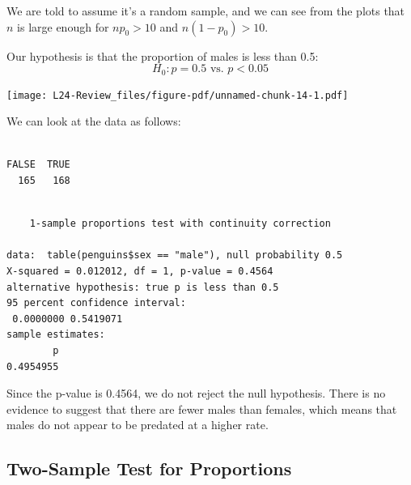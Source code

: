 \documentclass[
  letterpaper,
  DIV=11,
  numbers=noendperiod,
  oneside]{scrreprt}
\newenvironment{Shaded}{\begin{snugshade}}{\end{snugshade}}
\newcommand{\AttributeTok}[1]{\textcolor[rgb]{0.40,0.45,0.13}{#1}}
\newcommand{\FloatTok}[1]{\textcolor[rgb]{0.68,0.00,0.00}{#1}}
\newcommand{\FunctionTok}[1]{\textcolor[rgb]{0.28,0.35,0.67}{#1}}
\newcommand{\NormalTok}[1]{\textcolor[rgb]{0.00,0.23,0.31}{#1}}
\newcommand{\SpecialCharTok}[1]{\textcolor[rgb]{0.37,0.37,0.37}{#1}}
\newcommand{\StringTok}[1]{\textcolor[rgb]{0.13,0.47,0.30}{#1}}
\begin{document}
\vspace{1cm}

We are told to assume it's a random sample, and we can see from the
plots that \(n\) is large enough for \(np_0>10\) and \(n(1-p_0)>10\).

Our hypothesis is that the proportion of males is less than 0.5: \[
H_0: p = 0.5\text{ vs. }p < 0.05
\]

\texttt{[image: L24-Review\_files/figure-pdf/unnamed-chunk-14-1.pdf]}

We can look at the data as follows:

\begin{Shaded}
\end{Shaded}

\begin{verbatim}

FALSE  TRUE 
  165   168 
\end{verbatim}

\begin{Shaded}
\end{Shaded}

\begin{verbatim}

    1-sample proportions test with continuity correction

data:  table(penguins$sex == "male"), null probability 0.5
X-squared = 0.012012, df = 1, p-value = 0.4564
alternative hypothesis: true p is less than 0.5
95 percent confidence interval:
 0.0000000 0.5419071
sample estimates:
        p 
0.4954955 
\end{verbatim}

Since the p-value is 0.4564, we do not reject the null hypothesis. There
is no evidence to suggest that there are fewer males than females, which
means that males do not appear to be predated at a higher rate.

\hypertarget{two-sample-test-for-proportions}{%
\subsection{Two-Sample Test for
Proportions}\label{two-sample-test-for-proportions}}
\end{document}
